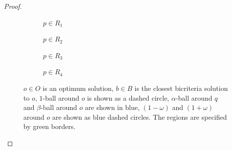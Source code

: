 \documentclass[11pt]{article}
\begin{document}
\begin{proof}
\begin{itemize}
\begin{figure}[ht]
{}
  \begin{subfigure}[b]{0.5\linewidth}
    \centering
    \tikzI
    \caption{\footnotesize  $p \in R_1$ } 
    \label{fig:a} 
    \vspace{4ex}
 \end{subfigure}%
 \begin{subfigure}[b]{0.5\linewidth}
    \centering
    \tikzII    
    \caption{$p\in R_2$} 
    \label{fig:b} 
    \vspace{4ex}
 \end{subfigure} 
 \begin{subfigure}[b]{0.5\linewidth}
    \centering
    \tikzIII
    \caption{$p \in R_3$} 
    \label{fig:c} 
    \vspace{4ex}
 \end{subfigure}%
 \begin{subfigure}[b]{0.5\linewidth}
 \centering
  \tikzIV
  \caption{$p\in R_4$}
  \label{fig:d} 
  \end{subfigure} 
  \caption{\footnotesize $o\in O$ is an optimum solution, $b\in B$ is the closest bicriteria solution to $o$, $1$-ball around $o$ is shown as a dashed circle, $\alpha$-ball around $q$ and $\beta$-ball around $o$ are shown in blue, $(1-\omega)$ and $(1+\omega)$ around $o$ are shown as blue dashed circles. The regions are specified by green borders. }
  \label{fig} 
\end{figure}



\end{itemize}
\end{proof}
\end{document}

